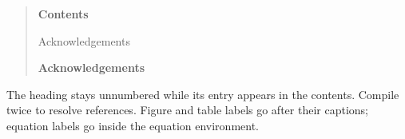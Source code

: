 \begin{quote}
\textbf{Contents}\par
Acknowledgements\par\medskip
\textbf{Acknowledgements}
\end{quote}
The heading stays unnumbered while its entry appears in the contents.
Compile twice to resolve references. Figure and table labels go after
their captions; equation labels go inside the equation environment.
